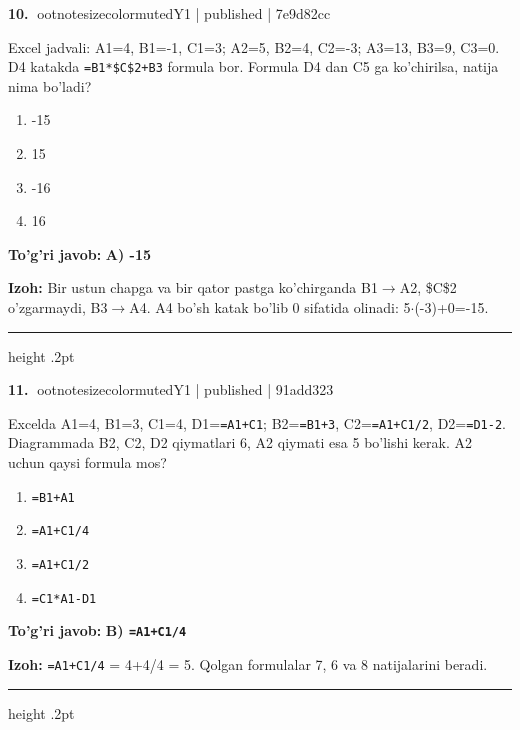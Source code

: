 \documentclass[10pt,a4paper]{article}
\begin{document}
\textbf{\color{ink}10.} {ootnotesizecolor{muted}Y1 | published | 7e9d82cc}
\par
Excel jadvali: A1=4, B1=-1, C1=3; A2=5, B2=4, C2=-3; A3=13, B3=9, C3=0. D4 katakda \texttt{=B1*\$C\$2+B3} formula bor. Formula D4 dan C5 ga ko'chirilsa, natija nima bo'ladi?
\begin{enumerate}[label=\Alph*),leftmargin=9mm]
\item -15
\item 15
\item -16
\item 16
\end{enumerate}
\begin{tcolorbox}[enhanced,breakable,colback=teal!4,colframe=teal!55!black,boxrule=0.45pt,arc=1.2mm,left=2.8mm,right=2.8mm,top=2mm,bottom=2mm]
\textbf{\color{teal}To'g'ri javob:} \textbf{A) -15}
\par\smallskip
\textbf{Izoh:} Bir ustun chapga va bir qator pastga ko'chirganda B1\ensuremath{\rightarrow}A2, \$C\$2 o'zgarmaydi, B3\ensuremath{\rightarrow}A4. A4 bo'sh katak bo'lib 0 sifatida olinadi: 5\ensuremath{\cdot}(-3)+0=-15.
\end{tcolorbox}
\vspace{2mm}\hrule height .2pt\vspace{2mm}

\textbf{\color{ink}11.} {ootnotesizecolor{muted}Y1 | published | 91add323}
\par
Excelda A1=4, B1=3, C1=4, D1=\texttt{=A1+C1}; B2=\texttt{=B1+3}, C2=\texttt{=A1+C1/2}, D2=\texttt{=D1-2}. Diagrammada B2, C2, D2 qiymatlari 6, A2 qiymati esa 5 bo'lishi kerak. A2 uchun qaysi formula mos?
\begin{enumerate}[label=\Alph*),leftmargin=9mm]
\item \texttt{=B1+A1}
\item \texttt{=A1+C1/4}
\item \texttt{=A1+C1/2}
\item \texttt{=C1*A1-D1}
\end{enumerate}
\begin{tcolorbox}[enhanced,breakable,colback=teal!4,colframe=teal!55!black,boxrule=0.45pt,arc=1.2mm,left=2.8mm,right=2.8mm,top=2mm,bottom=2mm]
\textbf{\color{teal}To'g'ri javob:} \textbf{B) \texttt{=A1+C1/4}}
\par\smallskip
\textbf{Izoh:} \texttt{=A1+C1/4} = 4+4/4 = 5. Qolgan formulalar 7, 6 va 8 natijalarini beradi.
\end{tcolorbox}
\vspace{2mm}\hrule height .2pt\vspace{2mm}
\end{document}
